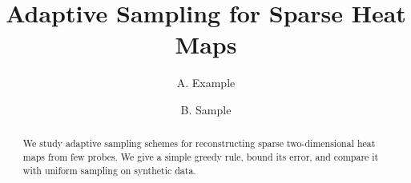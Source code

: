 \documentclass[11pt]{article}
\title{Adaptive Sampling for Sparse Heat Maps}
\author{A. Example \and B. Sample}
\date{}
\begin{document}
\maketitle

\begin{abstract}
We study adaptive sampling schemes for reconstructing sparse two-dimensional
heat maps from few probes. We give a simple greedy rule, bound its error, and
compare it with uniform sampling on synthetic data.
\end{abstract}








\end{document}
